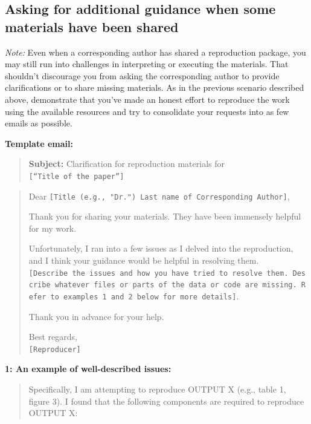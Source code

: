\documentclass[]{book}
\begin{document}
\hypertarget{asking-for-additional-guidance-when-some-materials-have-been-shared}{%
\subsection{Asking for additional guidance when some materials have been shared}\label{asking-for-additional-guidance-when-some-materials-have-been-shared}}

\emph{Note:} Even when a corresponding author has shared a reproduction package, you may still run into challenges in interpreting or executing the materials. That shouldn't discourage you from asking the corresponding author to provide clarifications or to share missing materials. As in the previous scenario described above, demonstrate that you've made an honest effort to reproduce the work using the available resources and try to consolidate your requests into as few emails as possible.

\textbf{Template email:}

\begin{quote}
\textbf{Subject:} Clarification for reproduction materials for \texttt{{[}“Title\ of\ the\ paper”{]}}
\end{quote}

\begin{quote}
Dear \texttt{{[}Title\ (e.g.,\ "Dr.")\ Last\ name\ of\ Corresponding\ Author{]}},

Thank you for sharing your materials. They have been immensely helpful for my work.

Unfortunately, I ran into a few issues as I delved into the reproduction, and I think your guidance would be helpful in resolving them. \texttt{{[}Describe\ the\ issues\ and\ how\ you\ have\ tried\ to\ resolve\ them.\ Describe\ whatever\ files\ or\ parts\ of\ the\ data\ or\ code\ are\ missing.\ Refer\ to\ examples\ 1\ and\ 2\ below\ for\ more\ details{]}}.

Thank you in advance for your help.

Best regards,\\
\texttt{{[}Reproducer{]}}
\end{quote}

\textbf{1: An example of well-described issues:}

\begin{quote}
Specifically, I am attempting to reproduce OUTPUT X (e.g., table 1, figure 3). I found that the following components are required to reproduce OUTPUT X:
\end{quote}
\end{document}
